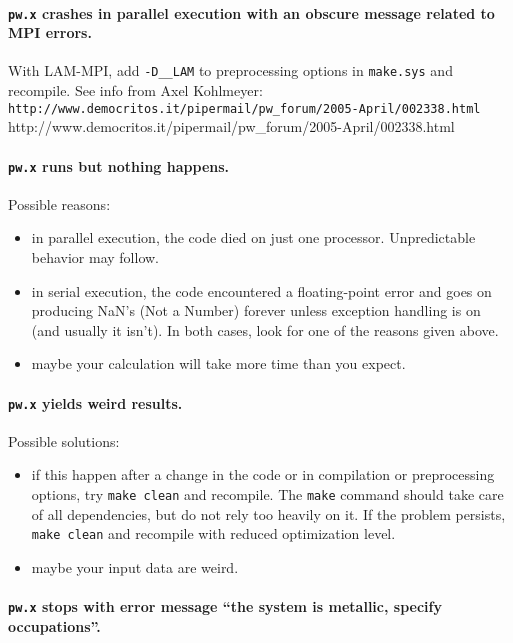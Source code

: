 \documentclass[12pt,a4paper]{article}
\begin{document}
\paragraph{\texttt{pw.x} crashes in parallel execution with an obscure
            message related to MPI errors.}

With LAM-MPI, add \texttt{-D\_\_LAM} to preprocessing options in 
\texttt{make.sys} and recompile. 
See info from Axel Kohlmeyer:\hfill\break
\htmladdnormallink%
{{\small\texttt{http://www.democritos.it/pipermail/pw\_forum/2005-April/002338.html}}}%
{http://www.democritos.it/pipermail/pw_forum/2005-April/002338.html}

\paragraph{\texttt{pw.x} runs but nothing happens.}

Possible reasons:
\begin{itemize}
  \item
    in parallel execution, the code died on just one processor.
    Unpredictable behavior may follow.
  \item
    in serial execution, the code encountered a floating-point error
    and goes on producing NaN's (Not a Number) forever unless
    exception handling is on (and usually it isn't).
    In both cases, look for one of the reasons given above.
  \item
    maybe your calculation will take more time than you expect.
\end{itemize}

\paragraph{\texttt{pw.x} yields weird results.}

Possible solutions:
\begin{itemize}
  \item
    if this happen after a change in the code or in compilation or
    preprocessing options, try \texttt{make clean} and recompile.
    The \texttt{make} command should take care of all dependencies,
    but do not rely too heavily on it. 
    If the problem persists, \texttt{make clean} and recompile with
    reduced optimization level.
  \item
    maybe your input data are weird.
\end{itemize}

\paragraph{\texttt{pw.x} stops with error message ``the system is
           metallic, specify occupations''.}
\end{document}
